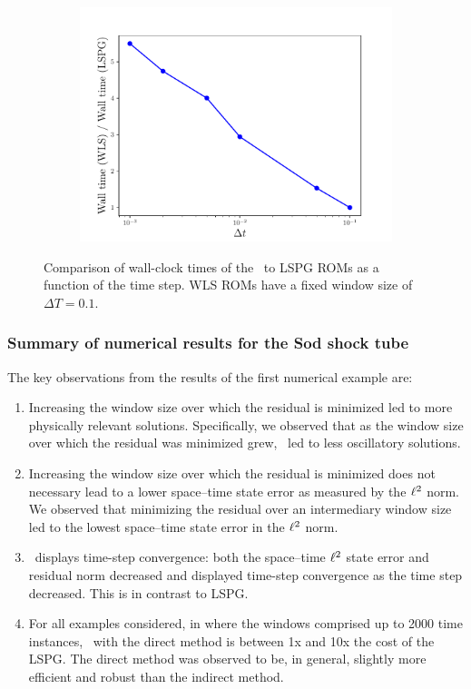 \begin{figure}
\begin{center}
\begin{subfigure}[t]{0.45\textwidth}
\includegraphics[width=1.\linewidth]{figs/sod/walltime_vs_window_dtvar.pdf}
\label{fig:sod_error_a}
\end{subfigure}
\caption{Comparison of wall-clock times of the \methodAcronymROMs\ to LSPG ROMs as a function of the time step. WLS ROMs have a fixed window size of $\Delta T = 0.1$.} 
\label{fig:walltime_dtvar}
\end{center}
\end{figure}


\subsubsection{Summary of numerical results for the Sod shock tube}
The key observations from the results of the first numerical example are: 
\begin{enumerate}
\item Increasing the window size over which the residual is minimized led to more physically relevant solutions. Specifically, we observed that as the window size over which the residual was minimized grew, \methodAcronym\ led to less oscillatory solutions.
\item Increasing the window size over which the residual is minimized does not necessary lead to a lower space--time state error as measured by the $\ell^2$ norm. We observed that minimizing the residual over an intermediary window size led to the lowest space--time state error in the $\ell^2$ norm. 
\item \methodAcronym\ displays time-step convergence: both the space--time $\ell^2$ state error and residual norm decreased and displayed time-step convergence as the time step decreased. This is in contrast to LSPG.
\item For all examples considered, in where the windows comprised up to 2000 time instances, \methodAcronym\ with the direct method is between 1x and 10x the cost of the LSPG. The 
direct method was observed to be, in general, slightly more efficient and robust than the indirect method.
\end{enumerate} 


